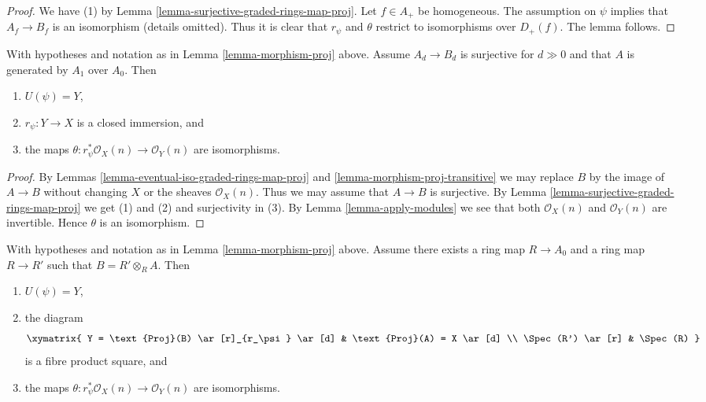 \begin{proof}
We have (1) by Lemma \ref{lemma-surjective-graded-rings-map-proj}.
Let $f \in A_{+}$ be homogeneous. The assumption on $\psi$ implies that
$A_f \to B_f$ is an isomorphism (details omitted). Thus it is clear that
$r_\psi$ and $\theta$ restrict to isomorphisms over $D_{+}(f)$.
The lemma follows.
\end{proof}

\begin{lemma}
\label{lemma-surjective-graded-rings-generated-degree-1-map-proj}
With hypotheses and notation as in Lemma \ref{lemma-morphism-proj} above.
Assume $A_d \to B_d$ is surjective for $d \gg 0$ and that $A$ is generated
by $A_1$ over $A_0$. Then
\begin{enumerate}
\item $U(\psi) = Y$,
\item $r_\psi : Y \to X$ is a closed immersion, and
\item the maps $\theta : r_\psi^*\mathcal{O}_X(n) \to \mathcal{O}_Y(n)$
are isomorphisms.
\end{enumerate}
\end{lemma}

\begin{proof}
By Lemmas \ref{lemma-eventual-iso-graded-rings-map-proj} and
\ref{lemma-morphism-proj-transitive}
we may replace $B$ by the image of $A \to B$
without changing $X$ or the sheaves $\mathcal{O}_X(n)$.
Thus we may assume that $A \to B$ is surjective. By
Lemma \ref{lemma-surjective-graded-rings-map-proj} we get (1) and (2)
and surjectivity in (3).
By Lemma \ref{lemma-apply-modules} we see that both
$\mathcal{O}_X(n)$ and $\mathcal{O}_Y(n)$
are invertible. Hence $\theta$ is an isomorphism.
\end{proof}

\begin{lemma}
\label{lemma-base-change-map-proj}
With hypotheses and notation as in Lemma \ref{lemma-morphism-proj} above.
Assume there exists a ring map $R \to A_0$ and a ring map
$R \to R'$ such that $B = R' \otimes_R A$. Then
\begin{enumerate}
\item $U(\psi) = Y$,
\item the diagram
$$
\xymatrix{
Y = \text{Proj}(B) \ar[r]_{r_\psi} \ar[d] &
\text{Proj}(A) = X \ar[d] \\
\Spec(R') \ar[r] &
\Spec(R)
}
$$
is a fibre product square, and
\item the maps $\theta : r_\psi^*\mathcal{O}_X(n) \to \mathcal{O}_Y(n)$
are isomorphisms.
\end{enumerate}
\end{lemma}

